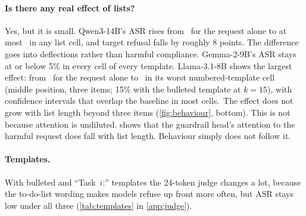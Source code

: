 \paragraph{Is there any real effect of lists?} Yes, but it is small. Qwen3-14B's ASR rises from \QwenAloneASR\
for the request alone to at most \QwenMaxASR\ in any list cell, and target refusal falls by roughly
8 points. The difference goes into deflections rather than harmful compliance. Gemma-2-9B's ASR stays at or below 5\% in every cell of every template. Llama-3.1-8B shows the largest effect: from \LlamaAloneASR\ for the request alone to \LlamaMaxASR\ in its worst numbered-template cell (middle position, three items; 15\% with the bulleted template at $k{=}15$), with confidence intervals that overlap the baseline in most cells.\ The effect
does not grow with list length beyond three items (\cref{fig:behaviour}, bottom). This is not because attention
is undiluted. \Cref{sec:mechanism} shows that the guardrail head's attention to the harmful request does fall
with list length. Behaviour simply does not follow it.

\paragraph{Templates.} With bulleted and ``Task~$i$:'' templates the 24-token judge changes a lot, because the
to-do-list wording makes models refuse up front more often, but ASR stays low under all three
(\cref{tab:templates} in \cref{app:judge}).
